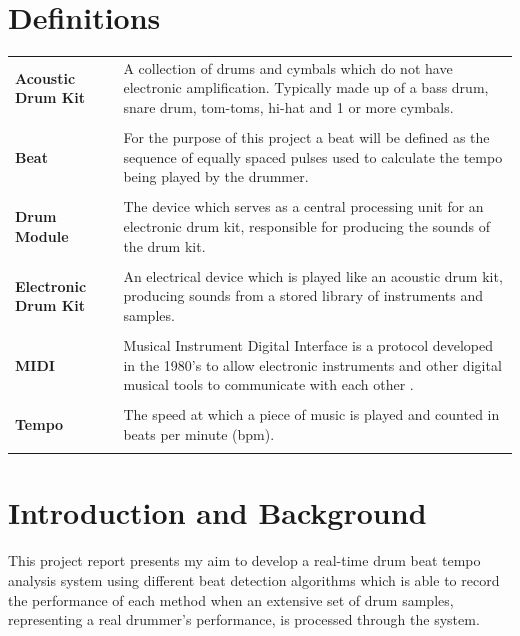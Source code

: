 \documentclass[a4paper, 11pt]{article}
\begin{document}
\section*{Definitions}
\begin{tabular}{l p{4.5in}}\\
\textbf{Acoustic Drum Kit} & A collection of drums and cymbals which do not have electronic amplification. Typically made up of a bass drum, snare drum, tom-toms, hi-hat and 1 or more cymbals.\\\\
\textbf{Beat} & For the purpose of this project a beat will be defined as the sequence of equally spaced pulses used to calculate the tempo being played by the drummer.\\\\
\textbf{Drum Module} & The device which serves as a central processing unit for an electronic drum kit, responsible for producing the sounds of the drum kit.\\\\
\textbf{Electronic Drum Kit} & An electrical device which is played like an acoustic drum kit, producing sounds from a stored library of instruments and samples.\\\\
\textbf{MIDI} & Musical Instrument Digital Interface is a protocol developed in the 1980's to allow electronic instruments and other digital musical tools to communicate with each other \cite{midi}.\\\\
\textbf{Tempo} & The speed at which a piece of music is played \cite{oxford-comp} and counted in beats per minute (bpm).\\\\
\end{tabular}
\clearpage

\maketitle{} \section{Introduction and Background}

This project report presents my aim to develop a real-time drum beat tempo analysis system using different beat detection algorithms which is able to record the performance of each method when an extensive set of drum samples, representing a real drummer's performance, is processed through the system.
\end{document}

